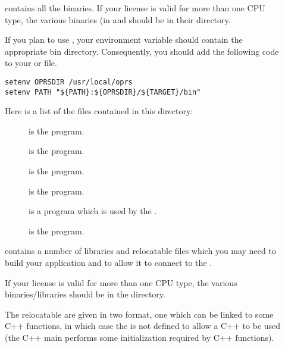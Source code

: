 \begin{description}

\item [] contains all the binaries. If your license is valid for more
than one CPU type, the various binaries (in  and  should be
in their  directory. 

If you plan to use \COPRSDE{}, your  environment variable should
contain the appropriate bin directory.  Consequently, you should add the
following code to your  or  file.

\begin{verbatim}
setenv OPRSDIR /usr/local/oprs
setenv PATH "${PATH}:${OPRSDIR}/${TARGET}/bin"
\end{verbatim}

Here is a list of the files contained in this directory:

\begin{description}

\item [] is the \CPK{} program.

\item [] is the \OPRSS{} program.

\item [] is the \XPK{} program.

\item [] is the \MPA{} program.

\item [] is a program which is used by the \XPK{}.

\item [] is the \OPE{} program.

\end{description}

\item [] contains a number of libraries and relocatable files which
you may need to build your application and to allow it to connect to the \MPA{}.

If your license is valid for more than one CPU type, the various
binaries/libraries should be in the  directory.

The relocatable are given in two format, one which can be linked to some C++
functions, in which case the  is not defined to allow a C++
 to be used (the C++ main performs some initialization required by
C++ functions).


\end{description}
